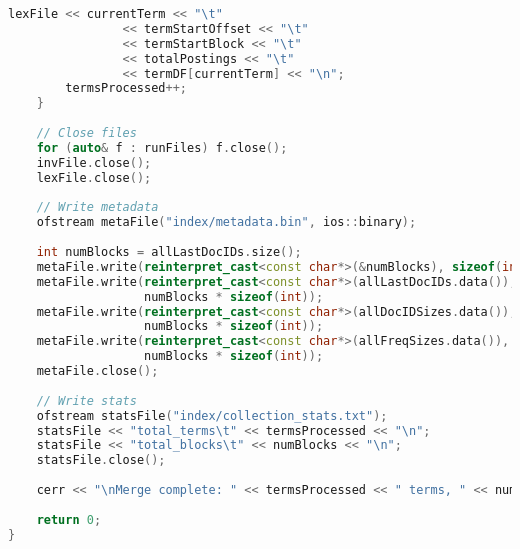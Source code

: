 \documentclass[11pt, a4paper]{report}
\begin{document}
\begin{lstlisting}[language=C++, caption={The complete source code for the merger component.}, label={lst:merger}]
        lexFile << currentTerm << "\t" 
                << termStartOffset << "\t"
                << termStartBlock << "\t"
                << totalPostings << "\t"
                << termDF[currentTerm] << "\n";
        termsProcessed++;
    }
    
    // Close files
    for (auto& f : runFiles) f.close();
    invFile.close();
    lexFile.close();
    
    // Write metadata
    ofstream metaFile("index/metadata.bin", ios::binary);
    
    int numBlocks = allLastDocIDs.size();
    metaFile.write(reinterpret_cast<const char*>(&numBlocks), sizeof(int));
    metaFile.write(reinterpret_cast<const char*>(allLastDocIDs.data()), 
                   numBlocks * sizeof(int));
    metaFile.write(reinterpret_cast<const char*>(allDocIDSizes.data()), 
                   numBlocks * sizeof(int));
    metaFile.write(reinterpret_cast<const char*>(allFreqSizes.data()), 
                   numBlocks * sizeof(int));
    metaFile.close();
    
    // Write stats
    ofstream statsFile("index/collection_stats.txt");
    statsFile << "total_terms\t" << termsProcessed << "\n";
    statsFile << "total_blocks\t" << numBlocks << "\n";
    statsFile.close();
    
    cerr << "\nMerge complete: " << termsProcessed << " terms, " << numBlocks << " blocks\n";
    
    return 0;
}
\end{lstlisting}
\end{document}
